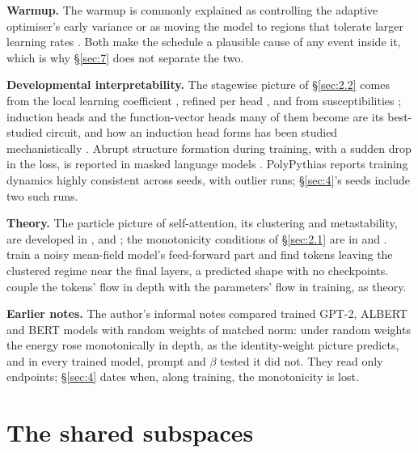 \documentclass[11pt]{article}
\begin{document}
\textbf{Warmup.} The warmup is commonly explained as controlling the adaptive optimiser's early variance \citep{liu2019} or as moving the model to regions that tolerate larger learning rates \citep{kalra2024}. Both make the schedule a plausible cause of any event inside it, which is why \S\ref{sec:7} does not separate the two.

\textbf{Developmental interpretability.} The stagewise picture of \S\ref{sec:2.2} comes from the local learning coefficient \citep{hoogland2024}, refined per head \citep{wang2024}, and from susceptibilities \citep{wang2025}; induction heads \citep{olsson2022} and the function-vector heads many of them become \citep{yin2025} are its best-studied circuit, and how an induction head forms has been studied mechanistically \citep{singh2024}. Abrupt structure formation during training, with a sudden drop in the loss, is reported in masked language models \citep{chen2023}. PolyPythias \citep{vanderwal2025} reports training dynamics highly consistent across seeds, with outlier runs; \S\ref{sec:4}'s seeds include two such runs.

\textbf{Theory.} The particle picture of self-attention, its clustering and metastability, are developed in \citet{geshkovski2023,geshkovski2024}, \citet{bruno2024} and \citet{rigollet2025}; the monotonicity conditions of \S\ref{sec:2.1} are in \citet{geshkovski2023} and \citet{pendharkar2026}. \citet{isobe2026} train a noisy mean-field model's feed-forward part and find tokens leaving the clustered regime near the final layers, a predicted shape with no checkpoints. \citet{herty2026} couple the tokens' flow in depth with the parameters' flow in training, as theory.

\textbf{Earlier notes.} The author's informal notes compared trained GPT-2, ALBERT and BERT models with random weights of matched norm: under random weights the energy rose monotonically in depth, as the identity-weight picture predicts, and in every trained model, prompt and $\beta $ tested it did not. They read only endpoints; \S\ref{sec:4} dates when, along training, the monotonicity is lost.

\appendix

\section{The shared subspaces}\label{sec:A}
\end{document}
